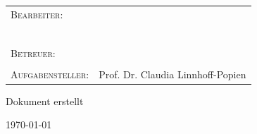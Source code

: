 \documentclass{article}
\begin{document}


\let\oldcontentsname\contentsname
\renewcommand{\contentsname}{\centering\small\oldcontentsname}

\title{\thesistitle}
\author{\authorA {} \authorB}
\date{\today}

\begin{titlepage}
	\centering
    \vspace*{-\topmargin}\vspace{-1in}%
    \vspace*{-\headheight}\vspace{-\headsep}%
    \vspace*{-\topskip}%
    \hspace*{-\oddsidemargin}
    \hspace*{-\marginparsep}
    \hspace*{-\marginparwidth}
	\vspace*{1.75cm}
	\par
	{\scshape\large \seminar\par}
	{\huge\bfseries\thesistitle\par}
	\vspace*{1.75cm}
	\large \begin{tabular}{ l l }
	  \textsc{Bearbeiter}:&{\authorA}\\
	  ~\\ %
	  \\
	  \textsc{Betreuer:}&{\supervisor}\\
	  \\
	  \textsc{Aufgabensteller:}&{Prof. Dr. Claudia Linnhoff-Popien}\\
	\end{tabular}
	\par
	\vspace*{1.75cm}
	\begin{otherlanguage}{ngerman}
		{\large Dokument erstellt\par\today\par}
	\end{otherlanguage}
	\newpage
	\thispagestyle{empty}
	\mbox{}
	\newpage
\end{titlepage}
\cleardoublepage
\end{document}
